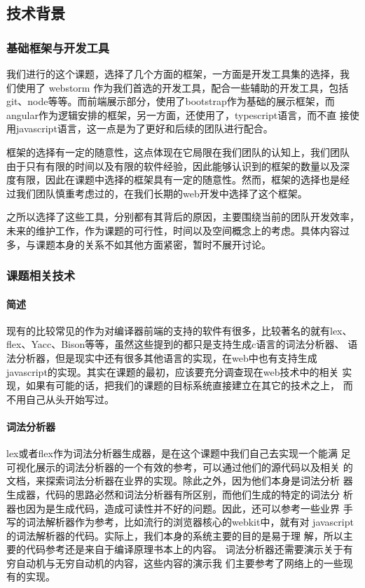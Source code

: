 \subsection{技术背景}
\subsubsection{基础框架与开发工具}
我们进行的这个课题，选择了几个方面的框架，一方面是开发工具集的选择，我
们使用了 webstorm 作为我们首选的开发工具，配合一些辅助的开发工具，包括
git、node等等。而前端展示部分，使用了bootstrap作为基础的展示框架，而
angular作为逻辑安排的框架，另一方面，还使用了，typescript语言，而不直
接使用javascript语言，这一点是为了更好和后续的团队进行配合。

框架的选择有一定的随意性，这点体现在它局限在我们团队的认知上，我们团队
由于只有有限的时间以及有限的软件经验，因此能够认识到的框架的数量以及深
度有限，因此在课题中选择的框架具有一定的随意性。然而，框架的选择也是经
过我们团队慎重考虑过的，在我们长期的web开发中选择了这个框架。

之所以选择了这些工具，分别都有其背后的原因，主要围绕当前的团队开发效率，
未来的维护工作，作为课题的可行性，时间以及空间概念上的考虑。具体内容过
多，与课题本身的关系不如其他方面紧密，暂时不展开讨论。
\subsubsection{课题相关技术}
\paragraph{简述} 
现有的比较常见的作为对编译器前端的支持的软件有很多，比较著名的就有lex、
flex、Yacc、Bison等等，虽然这些提到的都只是支持生成c语言的词法分析器、
语法分析器，但是现实中还有很多其他语言的实现，在web中也有支持生成
javascript的实现。其实在课题的最初，应该要充分调查现在web技术中的相关
实现，如果有可能的话，把我们的课题的目标系统直接建立在其它的技术之上，
而不用自己从头开始写过。
\paragraph{词法分析器} 
lex或者flex作为词法分析器生成器，是在这个课题中我们自己去实现一个能满
足可视化展示的词法分析器的一个有效的参考，可以通过他们的源代码以及相关
的文档，来探索词法分析器在业界的实现。除此之外，因为他们本身是词法分析
器生成器，代码的思路必然和词法分析器有所区别，而他们生成的特定的词法分
析器也因为是生成代码，造成可读性并不好的问题。因此，还可以参考一些业界
手写的词法解析器作为参考，比如流行的浏览器核心的webkit中，就有对
javascript的词法解析器的代码。实际上，我们本身的系统主要的目的是易于理
解，所以主要的代码参考还是来自于编译原理书本上的内容。
词法分析器还需要演示关于有穷自动机与无穷自动机的内容，这些内容的演示我
们主要参考了网络上的一些现有的实现。
